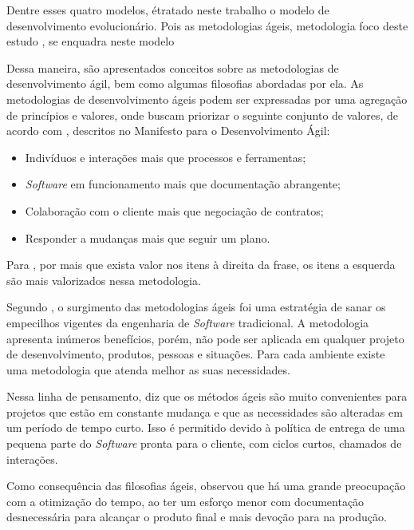 Dentre esses quatro modelos, étratado neste trabalho o modelo de desenvolvimento 
evolucionário. Pois as metodologias ágeis, metodologia foco deste estudo
, se enquadra neste modelo


Dessa maneira, são apresentados conceitos sobre as metodologias de desenvolvimento ágil, bem como algumas filosofias abordadas por ela.
As metodologias de desenvolvimento ágeis podem ser expressadas por uma agregação de princípios e valores, onde buscam priorizar o seguinte conjunto de valores, de acordo com \cite{beck2001agile}, descritos no Manifesto para o Desenvolvimento Ágil:


\begin{itemize}
    \item Indivíduos e interações mais que processos e ferramentas;
    \item \textit{Software} em funcionamento mais que documentação abrangente;
    \item Colaboração com o cliente mais que negociação de contratos;
    \item Responder a mudanças mais que seguir um plano.
\end{itemize}

Para \cite{beck2001agile}, por mais que exista valor nos itens à direita da frase, os itens a esquerda são mais valorizados nessa metodologia.

Segundo \cite{pressman2009engenharia}, o surgimento das metodologias ágeis foi uma estratégia de sanar os empecilhos vigentes da engenharia de \textit{Software} tradicional. A metodologia apresenta inúmeros benefícios, porém, não pode ser aplicada em qualquer projeto de desenvolvimento, produtos, pessoas e situações. Para cada ambiente existe uma metodologia que atenda melhor as suas necessidades.

Nessa linha de pensamento, \cite{pressman2009engenharia} diz que os métodos ágeis são muito convenientes para projetos que estão em constante mudança e que as necessidades são alteradas em um período de tempo curto. Isso é permitido devido à política de entrega de uma pequena parte do \textit{Software} pronta para o cliente, com ciclos curtos, chamados de interações.

Como consequência das filosofias ágeis, \cite{soares} observou que há uma grande preocupação com a otimização do tempo, ao ter um esforço menor com documentação desnecessária para alcançar o produto final e mais devoção para na produção.

